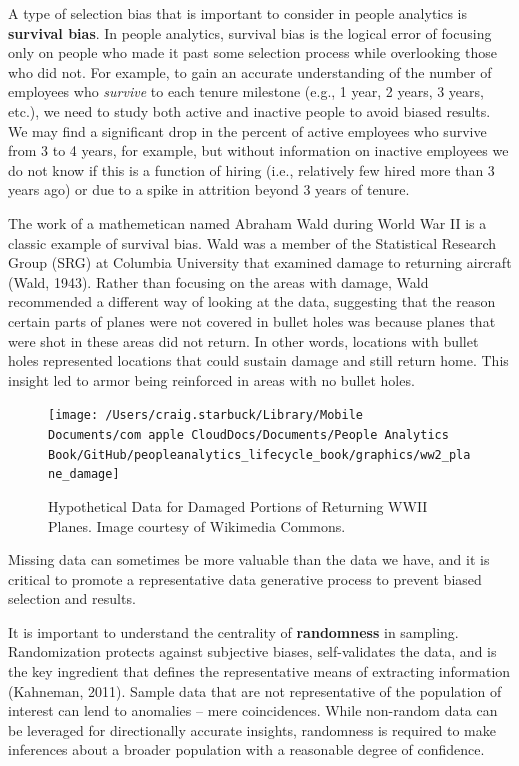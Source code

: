 \documentclass[]{book}
\begin{document}
A type of selection bias that is important to consider in people analytics is \textbf{survival bias}. In people analytics, survival bias is the logical error of focusing only on people who made it past some selection process while overlooking those who did not. For example, to gain an accurate understanding of the number of employees who \emph{survive} to each tenure milestone (e.g., 1 year, 2 years, 3 years, etc.), we need to study both active and inactive people to avoid biased results. We may find a significant drop in the percent of active employees who survive from 3 to 4 years, for example, but without information on inactive employees we do not know if this is a function of hiring (i.e., relatively few hired more than 3 years ago) or due to a spike in attrition beyond 3 years of tenure.

The work of a mathemetican named Abraham Wald during World War II is a classic example of survival bias. Wald was a member of the Statistical Research Group (SRG) at Columbia University that examined damage to returning aircraft (Wald, 1943). Rather than focusing on the areas with damage, Wald recommended a different way of looking at the data, suggesting that the reason certain parts of planes were not covered in bullet holes was because planes that were shot in these areas did not return. In other words, locations with bullet holes represented locations that could sustain damage and still return home. This insight led to armor being reinforced in areas with no bullet holes.

\begin{figure}

{\centering \texttt{[image: /Users/craig.starbuck/Library/Mobile Documents/com~apple~CloudDocs/Documents/People Analytics Book/GitHub/peopleanalytics\_lifecycle\_book/graphics/ww2\_plane\_damage]} 

}

\caption{Hypothetical Data for Damaged Portions of Returning WWII Planes. Image courtesy of Wikimedia Commons.}\label{fig:ww2-plane-damage}
\end{figure}

Missing data can sometimes be more valuable than the data we have, and it is critical to promote a representative data generative process to prevent biased selection and results.

It is important to understand the centrality of \textbf{randomness} in sampling. Randomization protects against subjective biases, self-validates the data, and is the key ingredient that defines the representative means of extracting information (Kahneman, 2011). Sample data that are not representative of the population of interest can lend to anomalies -- mere coincidences. While non-random data can be leveraged for directionally accurate insights, randomness is required to make inferences about a broader population with a reasonable degree of confidence.
\end{document}
